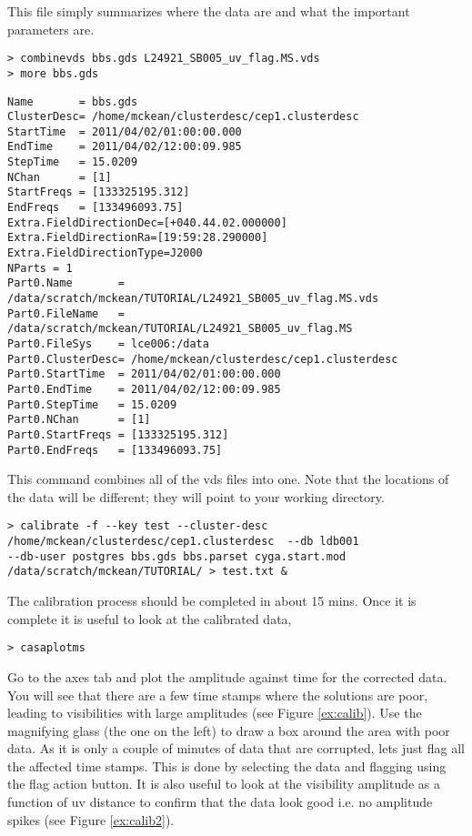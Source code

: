 This file simply summarizes where the data are and what the important parameters are.

\begin{verbatim}
> combinevds bbs.gds L24921_SB005_uv_flag.MS.vds
> more bbs.gds
\end{verbatim}
\begin{lstlisting}
Name       = bbs.gds
ClusterDesc= /home/mckean/clusterdesc/cep1.clusterdesc
StartTime  = 2011/04/02/01:00:00.000
EndTime    = 2011/04/02/12:00:09.985
StepTime   = 15.0209
NChan      = [1]
StartFreqs = [133325195.312]
EndFreqs   = [133496093.75]
Extra.FieldDirectionDec=[+040.44.02.000000]
Extra.FieldDirectionRa=[19:59:28.290000]
Extra.FieldDirectionType=J2000
NParts = 1
Part0.Name       = /data/scratch/mckean/TUTORIAL/L24921_SB005_uv_flag.MS.vds
Part0.FileName   = /data/scratch/mckean/TUTORIAL/L24921_SB005_uv_flag.MS
Part0.FileSys    = lce006:/data
Part0.ClusterDesc= /home/mckean/clusterdesc/cep1.clusterdesc
Part0.StartTime  = 2011/04/02/01:00:00.000
Part0.EndTime    = 2011/04/02/12:00:09.985
Part0.StepTime   = 15.0209
Part0.NChan      = [1]
Part0.StartFreqs = [133325195.312]
Part0.EndFreqs   = [133496093.75]
\end{lstlisting}

This command combines all of the vds files into one. Note that the locations of the data will be different; they will point to your working directory.

\begin{verbatim}
> calibrate -f --key test --cluster-desc 
/home/mckean/clusterdesc/cep1.clusterdesc  --db ldb001 
--db-user postgres bbs.gds bbs.parset cyga.start.mod
/data/scratch/mckean/TUTORIAL/ > test.txt &
\end{verbatim}

The calibration process should be completed in about 15 mins. Once it is complete it is useful to look at the calibrated data,
\begin{verbatim}
> casaplotms
\end{verbatim}
Go to the axes tab and plot the amplitude against time for the corrected data. You will see that there are a few time stamps where the solutions are poor, leading to visibilities with large amplitudes (see Figure \ref{ex:calib}). Use the magnifying glass (the one on the left) to draw a box around the area with poor data. As it is only a couple of minutes of data that are corrupted, lets just flag all the affected time stamps. This is done by selecting the data and flagging using the flag action button. It is also useful to look at the visibility amplitude as a function of uv distance to confirm that the data look good i.e. no amplitude spikes (see Figure \ref{ex:calib2}).

